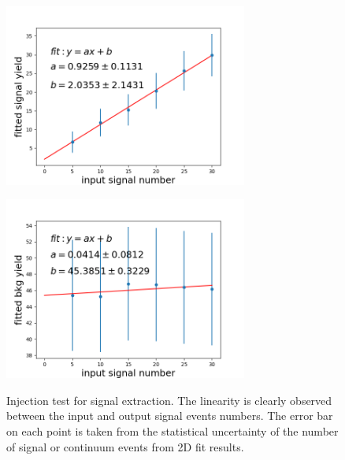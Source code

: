 \begin{figure}[htpb]
	\begin{minipage}[b]{0.5\linewidth}
		\centering 
		\includegraphics[height=6cm]{figures/inject_line_sig}
		\label{}
	\end{minipage}
	\begin{minipage}[b]{0.5\linewidth}
		\centering 
		\includegraphics[height=6cm]{figures/inject_line_bkg}
		\label{}
	\end{minipage}
	\caption{Injection test for signal extraction. The linearity is clearly observed between the input and output signal events numbers. The error bar on each point is taken from the statistical uncertainty of the number of signal or continuum events from 2D fit results.}
	\label{fig:2Dinjectline}
\end{figure}

